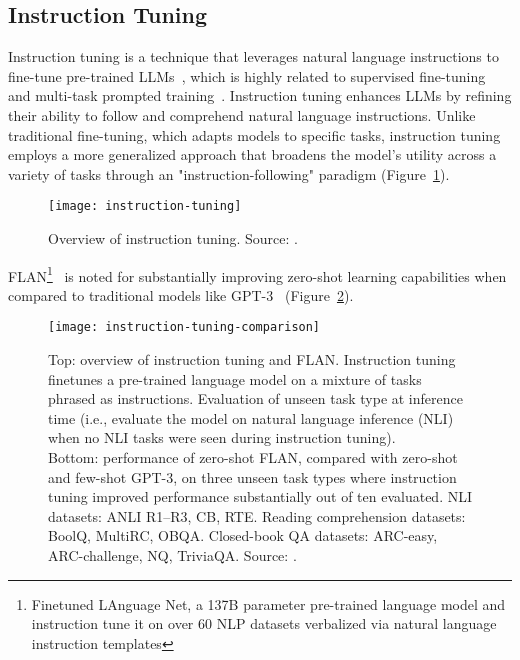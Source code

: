\subsection{Instruction Tuning}
\label{subsec:instruction-tuning}

Instruction tuning is a technique that leverages natural language instructions to fine-tune pre-trained LLMs~\cite{wei2022fine}, which is highly related to supervised fine-tuning~\cite{ouyang2022training} and multi-task prompted training~\cite{sanhetal2022multitask}.
Instruction tuning enhances LLMs by refining their ability to follow and comprehend natural language instructions.
Unlike traditional fine-tuning, which adapts models to specific tasks, instruction tuning employs a more generalized approach that broadens the model's utility across a variety of tasks through an "instruction-following" paradigm (Figure~\ref{fig:instruction-tuning}).

\begin{figure}[h!]
	\centering
	\texttt{[image: instruction-tuning]}
	\caption{Overview of instruction tuning. Source: \textcite{survey}.}
	\label{fig:instruction-tuning}
\end{figure}

FLAN\footnote{Finetuned LAnguage Net, a 137B parameter pre-trained language model and instruction tune it on over 60 NLP datasets verbalized via natural language instruction templates}~\cite{wei2022fine} is noted for substantially improving zero-shot learning capabilities when compared to traditional models like GPT-3~\cite{brown2020language} (Figure~\ref{fig:instruction-tuning-comparison}).

\begin{figure}[h!]
	\centering
	\texttt{[image: instruction-tuning-comparison]}
	\caption{Top: overview of instruction tuning and FLAN. Instruction tuning finetunes a pre-trained language model on a mixture of tasks phrased as instructions. Evaluation of unseen task type at inference time (i.e., evaluate the model on natural language inference (NLI) when no NLI tasks were seen during instruction tuning).\\
		Bottom: performance of zero-shot FLAN, compared with zero-shot and few-shot GPT-3, on three unseen task types where instruction tuning improved performance substantially out of ten evaluated. NLI datasets: ANLI R1–R3, CB, RTE. Reading comprehension datasets: BoolQ, MultiRC, OBQA. Closed-book QA datasets: ARC-easy, ARC-challenge, NQ, TriviaQA.
		Source: \textcite{wei2022fine}.}
	\label{fig:instruction-tuning-comparison}
\end{figure}

